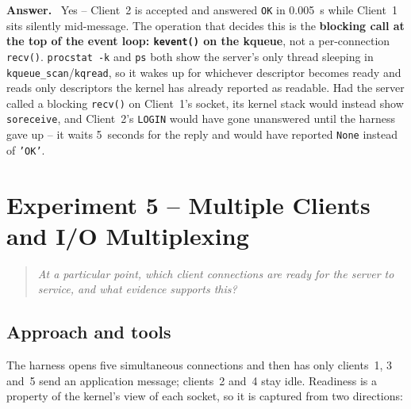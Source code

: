 \documentclass[11pt,a4paper]{article}
\newcommand{\qbox}[1]{%
  \begin{quote}\itshape #1\end{quote}%
}
\newenvironment{answer}
  {\begin{answerbox}\textbf{\color{accent}Answer.}\ }
  {\end{answerbox}}
\begin{document}
\begin{answer}
Yes -- Client~2 is accepted and answered \texttt{OK} in 0.005~s while Client~1 sits
silently mid-message.  The operation that decides this is the \textbf{blocking call at
the top of the event loop: \texttt{kevent()} on the kqueue}, not a per-connection
\texttt{recv()}.  \texttt{procstat -k} and \texttt{ps} both show the server's only
thread sleeping in \texttt{kqueue\_scan}/\texttt{kqread}, so it wakes up for whichever
descriptor becomes ready and reads only descriptors the kernel has already reported as
readable.  Had the server called a blocking \texttt{recv()} on Client~1's socket, its
kernel stack would instead show \texttt{soreceive}, and Client~2's \texttt{LOGIN} would
have gone unanswered until the harness gave up -- it waits 5~seconds for the reply and
would have reported \texttt{None} instead of \texttt{'OK'}.
\end{answer}

\section{Experiment 5 -- Multiple Clients and I/O Multiplexing}

\qbox{At a particular point, which client connections are ready for the server to
service, and what evidence supports this?}

\subsection*{Approach and tools}

The harness opens five simultaneous connections and then has only clients~1, 3 and~5
send an application message; clients~2 and~4 stay idle.  Readiness is a property of
the kernel's view of each socket, so it is captured from two directions:
\end{document}
